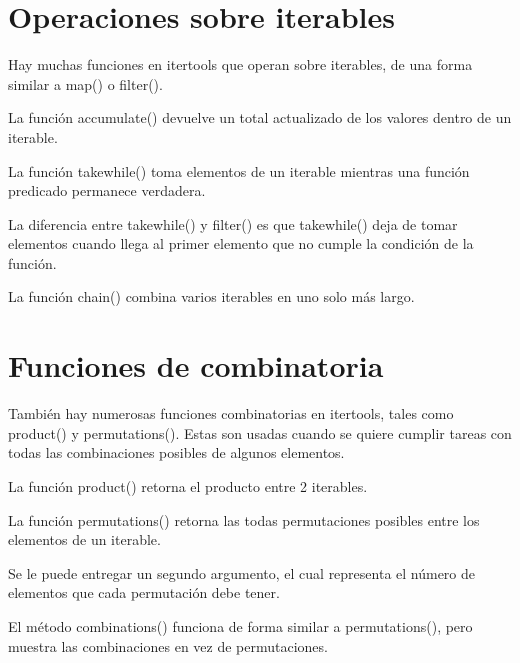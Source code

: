 \documentclass{report}
\begin{document}
\section{Operaciones sobre iterables}

Hay muchas funciones en itertools que operan sobre iterables, de una forma similar a map() o filter().

La función accumulate() devuelve un total actualizado de los valores dentro de un iterable.


La función takewhile() toma elementos de un iterable mientras una función predicado permanece verdadera.


La diferencia entre takewhile() y filter() es que takewhile() deja de tomar elementos cuando llega al primer elemento que no cumple la condición de la función.


La función chain() combina varios iterables en uno solo más largo.


\section{Funciones de combinatoria}

También hay numerosas funciones combinatorias en itertools, tales como product() y permutations(). Estas son usadas cuando se quiere cumplir tareas con todas las combinaciones posibles de algunos elementos.

La función product() retorna el producto entre 2 iterables.


La función permutations() retorna las todas permutaciones posibles entre los elementos de un iterable.



Se le puede entregar un segundo argumento, el cual representa el número de elementos que cada permutación debe tener.


El método combinations() funciona de forma similar a permutations(), pero muestra las combinaciones en vez de permutaciones.
\end{document}
